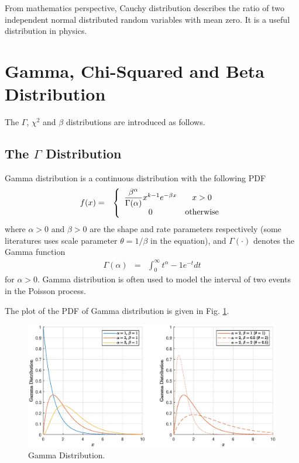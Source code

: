 From mathematics perspective, Cauchy distribution describes the ratio of two independent normal distributed random variables with mean zero. It is a useful distribution in physics.

\section{Gamma, Chi-Squared and Beta Distribution}

The $\Gamma$, $\chi^2$ and $\beta$ distributions are introduced as follows.

\subsection{The $\Gamma$ Distribution}

Gamma distribution is a continuous distribution with the following PDF
\begin{eqnarray}
  f(x) &=& \left\{\begin{array}{cc}
                    \dfrac{\beta^\alpha}{\Gamma(\alpha)}x^{k-1}e^{-\beta x} & x > 0 \\
                    0 & \textup{otherwise}
                  \end{array}\right. \label{eq:gammapdf}
\end{eqnarray}
where $\alpha>0$ and $\beta>0$ are the shape and rate parameters respectively (some literatures uses scale parameter $\theta = 1/\beta$ in the equation), and $\Gamma(\cdot)$ denotes the Gamma function
\begin{eqnarray}
  \Gamma(\alpha) &=& \int_{0}^{\infty}t^\alpha-1e^{-t}dt \nonumber
\end{eqnarray}
for $\alpha > 0$. Gamma distribution is often used to model the interval of two events in the Poisson process.

The plot of the PDF of Gamma distribution is given in Fig. \ref{fig:gamma_pdf}.
\begin{figure}
	\centering
	\includegraphics[width=350pt]{chapters/ch-commonly-seen-distributions/figs/gamma_pdf.eps}
	\caption{Gamma Distribution.} \label{fig:gamma_pdf}
\end{figure}

